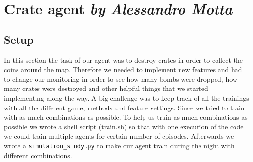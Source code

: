 \section[Crate agent]{Crate agent  \hfill \small \normalfont\textit{by Alessandro Motta}}
\subsection{Setup}
In this section the task of our agent was to destroy crates in order to collect the coins around the map. Therefore we needed to implement new features and had to change our monitoring in order to see how many bombs were dropped, how many crates were destroyed and other helpful things that we started implementing along the way. A big challenge was to keep track of all the trainings with all the different game, methods and feature settings. Since we tried to train with as much combinations as possible. To help us train as much combinations as possible we wrote a shell script (train.sh) so that with one execution of the code we could train multiple agents for certain number of episodes. Afterwards we wrote a \texttt{simulation\_study.py} to make our agent train during the night with different combinations.













